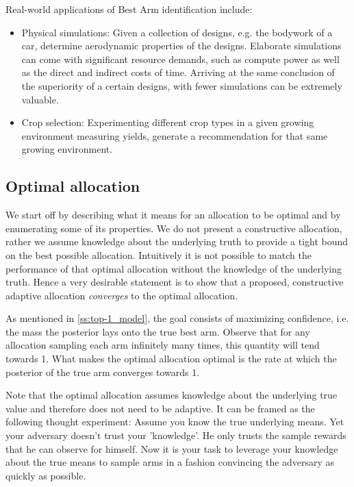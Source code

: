 Real-world applications of Best Arm identification include:
\begin{itemize}
  \item Physical simulations: Given a collection of designs, e.g. the bodywork
  of a car, determine aerodynamic properties of the designs. Elaborate
  simulations can come with significant resource demands, such as compute power
  as well as the direct and indirect costs of time. Arriving at the same
  conclusion of the superiority of a certain designs, with fewer simulations can
  be extremely valuable.
  \item Crop selection: Experimenting different crop types in a given growing
  environment measuring yields, generate a recommendation for that same growing
  environment.
\end{itemize}


\subsection{Optimal allocation}\label{subsection:optimal_allocation}

We start off by describing what it means for an allocation to be optimal and by
enumerating some of its properties. We do not present a constructive allocation,
rather we assume knowledge about the underlying truth to provide a tight bound
on the best possible allocation. Intuitively it is not possible to match the
performance of that optimal allocation without the knowledge of the underlying
truth. Hence a very desirable statement is to show that a proposed, constructive
adaptive allocation \emph{converges} to the optimal allocation.

As mentioned in \ref{ss:top-1_model}, the goal consists of maximizing
confidence, i.e. the mass the posterior lays onto the true best arm. Observe
that for any allocation sampling each arm infinitely many times, this quantity
will tend towards 1. What makes the optimal allocation optimal is the rate at
which the posterior of the true arm converges towards 1.

Note that the optimal allocation assumes knowledge about the underlying true
value and therefore does not need to be adaptive. It can be framed as the
following thought experiment: Assume you know the true underlying means. Yet
your adversary doesn't trust your 'knowledge'. He only trusts the sample rewards
that he can observe for himself. Now it is your task to leverage your knowledge
about the true means to sample arms in a fashion convincing the adversary as
quickly as possible.

